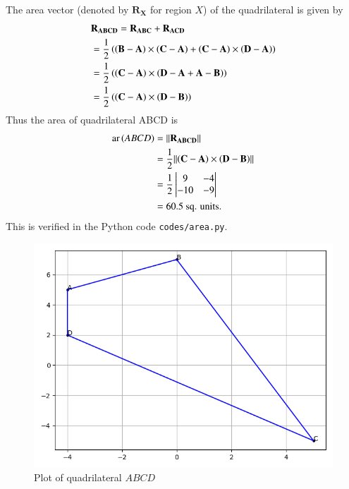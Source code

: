 \documentclass[journal,12pt,twocolumn]{IEEEtran}
\let\vec\mathbf
\begin{document}
\begin{enumerate}
    The area vector (denoted by $\vec{R_X}$ for region $X$) of the quadrilateral 
    is given by
    \begin{align}
        &\vec{R_{ABCD}} = \vec{R_{ABC}} + \vec{R_{ACD}} \\
        &= \frac{1}{2}\brak{\brak{\vec{B}-\vec{A}}\times\brak{\vec{C}-\vec{A}} + 
        \brak{\vec{C}-\vec{A}}\times\brak{\vec{D}-\vec{A}}} \\
        &= \frac{1}{2}\brak{\brak{\vec{C}-\vec{A}}\times
        \brak{\vec{D}-\vec{A}+\vec{A}-\vec{B}}} \\
        &= \frac{1}{2}\brak{\brak{\vec{C}-\vec{A}}\times\brak{\vec{D}-\vec{B}}} \\
        \label{eq:area-diag} 
    \end{align}
    Thus the area of quadrilateral ABCD is
    \begin{align}
        \textrm{ar}\brak{ABCD} &= \norm{\vec{R_{ABCD}}} \\
                               &= \frac{1}{2}\norm{\brak{\vec{C}-\vec{A}}\times\brak{\vec{D}-\vec{B}}} \\ 
                               &= \frac{1}{2}\mydet{9&-4\\-10&-9} \\
                               &= 60.5\ \textrm{sq. units.}
        \label{eq:ans}
    \end{align}
    This is verified in the Python code \texttt{codes/area.py}.
    \begin{figure}[!htb]
        \centering
        \includegraphics[width=\columnwidth]{figs/quad.png}
        \caption{Plot of quadrilateral $ABCD$}
        \label{fig:quad}
    \end{figure}
\end{enumerate}
\end{document}
